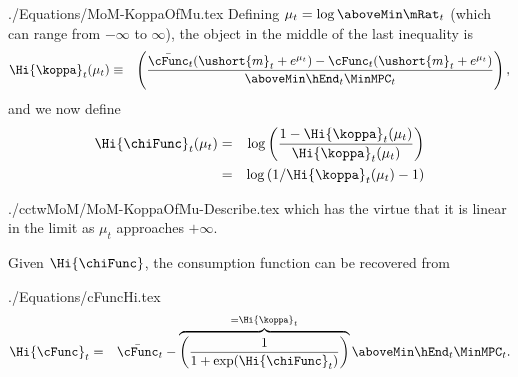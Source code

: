 \documentclass[titlepage]{\econtex}
\begin{document}
\begin{verbatimwrite}{./Equations/MoM-KoppaOfMu.tex}
  Defining $\mu_{t} =
  \log \aboveMin \mRat_{t}$ (which can range from $-\infty$ to $\infty$), the object in the middle of the last inequality is
  \begin{eqnarray}
    \Hi{\koppa}_{t}(\mu_{t})  & \equiv & \left(\frac{\bar{\cFunc}_{t}(\ushort{m}_{t}+e^{\mu_{t}})-\cFunc_{t}(\ushort{m}_{t}+e^{\mu_{t}})}{\aboveMin \hEnd_{t} \MinMPC_{t}}\right), \label{eq:koppa}
  \end{eqnarray}
  and we now define
  \begin{eqnarray}
    \Hi{\chiFunc}_{t}(\mu_{t}) & = & \log \left(\frac{1-\Hi{\koppa}_{t}(\mu_{t})}{\Hi{\koppa}_{t}(\mu_{t})}\right)
    \\ & = & \log \left(1/\Hi{\koppa}_{t}(\mu_{t})-1\right) \label{eq:chi}
  \end{eqnarray}
\end{verbatimwrite}

\begin{verbatimwrite}{./cctwMoM/MoM-KoppaOfMu-Describe.tex}
  which has the virtue that it is linear in the limit as $\mu_{t}$ approaches $+\infty$.

  Given $\Hi{\chiFunc}$, the consumption function can be recovered from
\end{verbatimwrite}

\begin{verbatimwrite}{./Equations/cFuncHi.tex}
  \begin{eqnarray}
    \Hi{\cFunc}_{t} & = & \bar{\cFunc}_{t}-\overbrace{\left(\frac{1}{1+\exp(\Hi{\chiFunc}_{t})}\right)}^{=\Hi{\koppa}_{t}} \aboveMin \hEnd_{t} \MinMPC_{t}. \label{eq:cFuncHi}
  \end{eqnarray}
\end{verbatimwrite}

\end{document}
